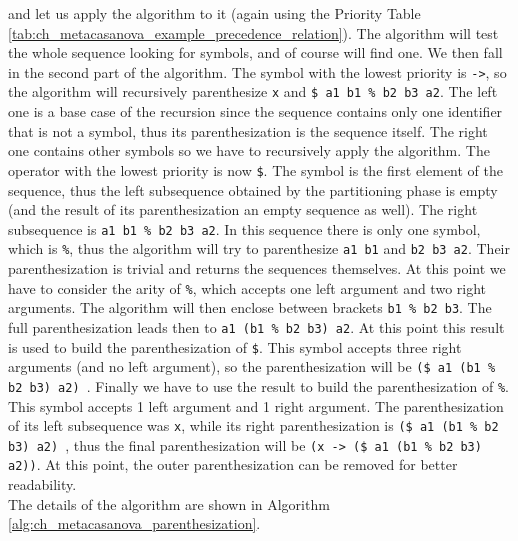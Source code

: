 \noindent
and let us apply the algorithm to it (again using the Priority Table \ref{tab:ch_metacasanova_example_precedence_relation}). The algorithm will test the whole sequence looking for symbols, and of course will find one. We then fall in the second part of the algorithm. The symbol with the lowest priority is \texttt{->}, so the algorithm will recursively parenthesize \texttt{x} and \texttt{\$ a1 b1 \% b2 b3 a2}. The left one is a base case of the recursion since the sequence contains only one identifier that is not a symbol, thus its parenthesization is the sequence itself. The right one contains other symbols so we have to recursively apply the algorithm. The operator with the lowest priority is now \texttt{\$}. The symbol is the first element of the sequence, thus the left subsequence obtained by the partitioning phase is empty (and the result of its parenthesization an empty sequence as well). The right subsequence is \texttt{a1 b1 \% b2 b3 a2}. In this sequence there is only one symbol, which is \texttt{\%}, thus the algorithm will try to parenthesize \texttt{a1 b1} and \texttt{b2 b3 a2}. Their parenthesization is trivial and returns the sequences themselves. At this point we have to consider the arity of \texttt{\%}, which accepts one left argument and two right arguments. The algorithm will then enclose between brackets \texttt{b1 \% b2 b3}. The full parenthesization leads then to \texttt{a1 (b1 \% b2 b3) a2}. At this point this result is used to build the parenthesization of \texttt{\$}. This symbol accepts three right arguments (and no left argument), so the parenthesization will be \texttt{(\$ a1 (b1 \% b2 b3) a2) }. Finally we have to use the result to build the parenthesization of \texttt{\%}. This symbol accepts 1 left argument and 1 right argument. The parenthesization of its left subsequence was \texttt{x}, while its right parenthesization is \texttt{(\$ a1 (b1 \% b2 b3) a2) }, thus the final parenthesization will be \texttt{(x -> (\$ a1 (b1 \% b2 b3) a2))}. At this point, the outer parenthesization can be removed for better readability.\\
The details of the algorithm are shown in Algorithm \ref{alg:ch_metacasanova_parenthesization}.

